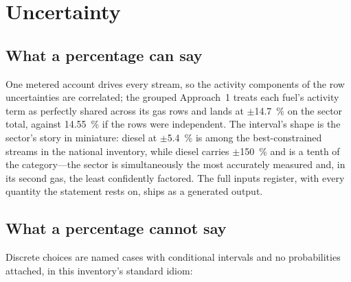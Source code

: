 \section{Uncertainty}
\label{sec:uncertainty}

\subsection{What a percentage can say}

One metered account drives every stream, so the activity components of the row
uncertainties are correlated; the grouped Approach~1 treats each fuel's activity term as
perfectly shared across its gas rows and lands at $\pm$\SI{14.7}{\percent} on the sector
total, against \SI{14.55}{\percent} if the rows were independent. The interval's shape is
the sector's story in miniature: diesel \COtwo{} at $\pm$\SI{5.4}{\percent} is among the
best-constrained streams in the national inventory, while diesel \NtwoO{} carries
$\pm$\SI{150}{\percent} and is a tenth of the category---the sector is simultaneously the
most accurately measured and, in its second gas, the least confidently factored. The full
inputs register, with every quantity the statement rests on, ships as a generated output.

\subsection{What a percentage cannot say}

Discrete choices are named cases with conditional intervals and no probabilities attached,
in this inventory's standard idiom:

